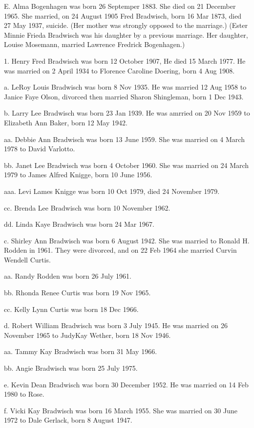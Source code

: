 \documentclass[a4paper]{article}
\begin{document}
E. Alma Bogenhagen was born 26 Septemper 1883. She died on 21 December 1965. She married, on 24 August 1905 Fred Bradwisch, born 16 Mar 1873, died 27 May 1937, suicide.  (Her mother was strongly opposed to the marriage.)    (Ester Minnie Frieda Bradwisch was his daughter by a previous marriage.  Her daughter, Louise Mosemann, married Lawrence Fredrick Bogenhagen.)  

1. Henry  Fred Bradwisch was born 12 October 1907,  He died 15 March 1977. He was married on 2 April 1934 to Florence Caroline Doering, born 4 Aug 1908.
 
a. LeRoy Louis Bradwisch was born 8 Nov 1935.  He was married 12 Aug 1958 to Janice Faye Olson, divorced then married Sharon Shingleman, born 1 Dec 1943.

b. Larry Lee Bradwisch was born 23 Jan 1939.  He was amrried on 20 Nov 1959 to Elizabeth Ann Baker, born 12 May 1942.
 
aa. Debbie Ann Bradwisch was born 13 June 1959.  She was married on 4 March 1978 to David Varlotto.
 
bb. Janet Lee Bradwisch was born 4 October 1960.  She was married on 24 March 1979 to James Alfred Knigge, born 10 June 1956.
 
aaa. Levi Lames Knigge was born 10 Oct 1979, died 24 November 1979.
 
cc. Brenda Lee Bradwisch was born 10 November 1962.

dd. Linda Kaye Bradwisch was born 24 Mar 1967.

c. Shirley Ann Bradwisch was born 6 August 1942.  She was married to Ronald H. Rodden in 1961.  They were divorced, and on 22 Feb 1964 she married Curvin Wendell Curtis.
 
aa. Randy Rodden was born 26 July 1961. 

bb. Rhonda Renee  Curtis was born 19 Nov 1965.

cc. Kelly Lynn Curtis was born 18 Dec 1966.

d. Robert William Bradwisch was born 3 July 1945.  He was married on 26 November 1965 to JudyKay Wether, born 18 Nov 1946.
 
aa. Tammy Kay Bradwisch was born 31 May 1966.

bb. Angie Bradwisch was born 25 July 1975.

e. Kevin Dean Bradwisch was born 30 December 1952.  He was married on 14 Feb 1980 to Rose.

f. Vicki Kay Bradwisch was born 16 March 1955.  She was married on 30 June 1972 to Dale Gerlack, born 8 August 1947.
 
\end{document}
